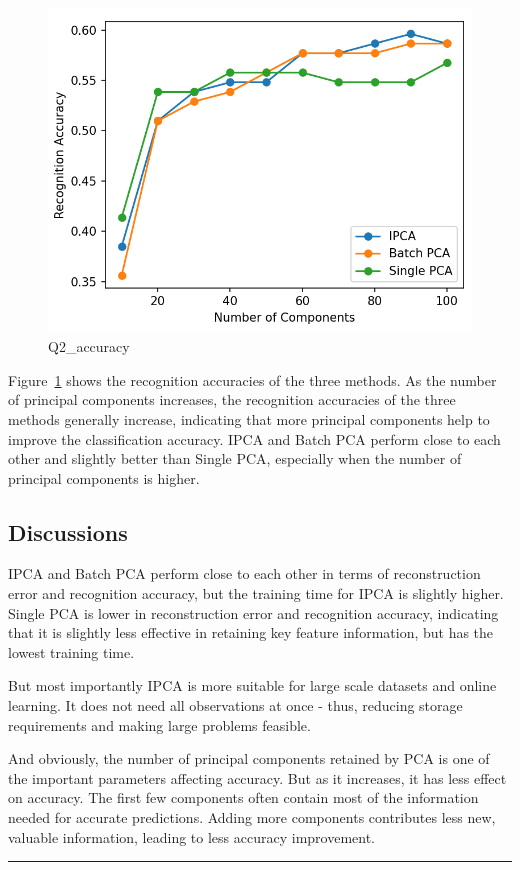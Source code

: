 \begin{figure}[H]
	\centering
	\includegraphics[width=0.8\linewidth]{Ressources/Q2_accuracy.png}
	
	\caption{Q2\_accuracy}
	\label{fig:Q2_accuracy}
\end{figure}
Figure~\ref{fig:Q2_accuracy} shows the recognition accuracies of the three methods. As the number of principal components increases, the recognition accuracies of the three methods generally increase, indicating that more principal components help to improve the classification accuracy. IPCA and Batch PCA perform close to each other and slightly better than Single PCA, especially when the number of principal components is higher.


\subsection{Discussions}

IPCA and Batch PCA perform close to each other in terms of reconstruction error and recognition accuracy, but the training time for IPCA is slightly higher. Single PCA is lower in reconstruction error and recognition accuracy, indicating that it is slightly less effective in retaining key feature information, but has the lowest training time.

But most importantly IPCA is more suitable for large scale datasets and online learning. It does not need all observations at once - thus, reducing storage requirements and making large problems feasible.

And obviously, the number of principal components retained by PCA is one of the important parameters affecting accuracy. But as it increases, it has less effect on accuracy. The first few components often contain most of the information needed for accurate predictions. Adding more components contributes less new, valuable information, leading to less accuracy improvement.
\newline
\rule{\textwidth}{1mm}
